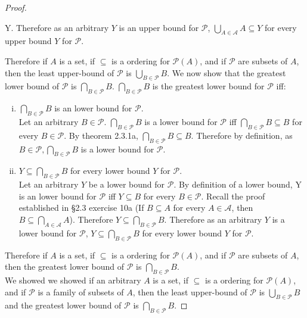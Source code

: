 \documentclass[a4paper,11pt]{article}
\begin{document}
{\begin{theorem1}
\begin{proof}
\begin{enumerate}[(i)]
      Y\). Therefore as an arbitrary \(Y\) is an upper bound for \(\mathscr{P}\), \(\bigcup\limits_{A \in \mathscr{A}}A \subseteq Y\) 
      for every upper bound \(Y\) for \(\mathscr{P}\).
    \end{enumerate}
    Therefore if \(A\) is a set, if \(\subseteq\) is a ordering for \(\mathscr{P}{(A)}\), and if \(\mathscr{P}\) are subsets of \(A\), then the least upper-bound 
  of \(\mathscr{P}\) is \(\bigcup\limits_{B \in \mathscr{P}}B\).
  We now show that the greatest lower bound of \(\mathscr{P}\) is \(\bigcap\limits_{B \in \mathscr{P}}B\).
      \noindent\(\bigcap\limits_{B \in \mathscr{P}}B\) is the greatest lower bound for \(\mathscr{P}\) iff:
    \begin{enumerate}[(i)]
      \item \(\bigcap\limits_{B \in \mathscr{P}}B\) is an lower bound for \(\mathscr{P}\).\\
      Let an arbitrary \(B \in \mathscr{P}\). \(\bigcap\limits_{B \in \mathscr{P}}B\) is a lower bound for \(\mathscr{P}\) iff \(\bigcap\limits_{B \in \mathscr{P}}B \subseteq B\) for every \(B \in \mathscr{P}\). By theorem 2.3.1a, \(\bigcap\limits_{B \in \mathscr{P}}B \subseteq B\). 
      Therefore by definition, as \(B \in \mathscr{P}, \bigcap\limits_{B \in \mathscr{P}}B\) is a lower bound 
      for \(\mathscr{P}\).
      \item \(Y \subseteq \bigcap\limits_{B \in \mathscr{P}}B\) for every lower bound \(Y\) for 
      \(\mathscr{P}\).\\
      Let an arbitrary \(Y\) be a lower bound for \(\mathscr{P}\). By definition of a 
      lower bound, Y is an lower bound for \(\mathscr{P}\) iff \(Y \subseteq B\) for every \(B \in \mathscr{P}\). 
      Recall the proof established in \S 2.3 exercise 10a {(If \(B \subseteq A\) for every \(A \in \mathscr{A}\), then \(B \subseteq \bigcap\limits_{A \in \mathscr{A}}A\))}. Therefore \(Y \subseteq 
      \bigcap\limits_{B \in \mathscr{P}}B\). Therefore as an arbitrary \(Y\) is a lower bound for \(\mathscr{P}\), \(Y \subseteq \bigcap\limits_{B \in \mathscr{P}}B\) 
      for every lower bound \(Y\) for \(\mathscr{P}\).
    \end{enumerate}
    Therefore if \(A\) is a set, if \(\subseteq\) is a ordering for \(\mathscr{P}{(A)}\), and if \(\mathscr{P}\) are subsets of \(A\), then the greatest lower bound 
  of \(\mathscr{P}\) is \(\bigcap\limits_{B \in \mathscr{P}}B\).\\
  We showed we showed if an arbitrary \(A\) is a set, if \(\subseteq\) is a ordering for \(\mathscr{P}{(A)}\), and if \(\mathscr{P}\) is a family of subsets of \(A\), then the least upper-bound 
  of \(\mathscr{P}\) is \(\bigcup\limits_{B \in \mathscr{P}}B\) and the greatest lower bound of \(\mathscr{P}\) is \(\bigcap\limits_{B \in \mathscr{P}}B\).
  \end{proof}
\end{theorem1}
\newpage
\setcounter{ProblemCounter}{18}
}
\end{document}
